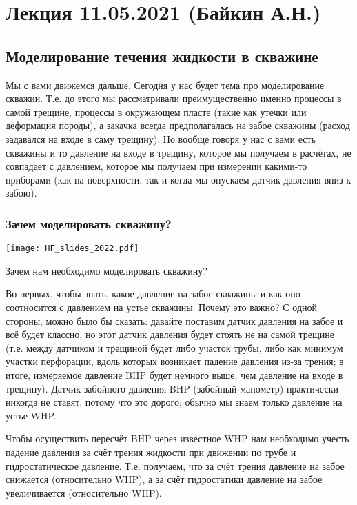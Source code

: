\documentclass[main.tex]{subfiles}
\begin{document}

\section{Лекция 11.05.2021 (Байкин А.Н.)}

\subsection{Моделирование течения жидкости в скважине}

Мы с вами движемся дальше.
Сегодня у нас будет тема про моделирование скважин.
Т.е. до этого мы рассматривали преимущественно именно процессы в самой трещине, процессы в окружающем пласте (такие как утечки или деформация породы), а закачка всегда предполагалась на забое скважины (расход задавался на входе в саму трещину).
Но вообще говоря у нас с вами есть скважины и то давление на входе в трещину, которое мы получаем в расчётах, не совпадает с давлением, которое мы получаем при измерении какими-то приборами (как на поверхности, так и когда мы опускаем датчик давления вниз к забою).
\\

\subsubsection{Зачем моделировать скважину?}

\texttt{[image: HF\_slides\_2022.pdf]}

Зачем нам необходимо моделировать скважину?

Во-первых, чтобы знать, какое давление на забое скважины и как оно соотносится с давлением на устье скважины.
Почему это важно?
С одной стороны, можно было бы сказать: давайте поставим датчик давления на забое и всё будет классно, но этот датчик давления будет стоять не на самой трещине (т.е. между датчиком и трещиной будет либо участок трубы, либо как минимум участки перфорации, вдоль которых возникает падение давления из-за трения; в итоге, измеряемое давление BHP будет немного выше, чем давление на входе в трещину).
Датчик забойного давления BHP (забойный манометр) практически никогда не ставят, потому что это дорого; обычно мы знаем только давление на устье WHP.

Чтобы осуществить пересчёт BHP через известное WHP нам необходимо учесть падение давления за счёт трения жидкости при движении по трубе и гидростатическое давление.
Т.е. получаем, что за счёт трения давление на забое снижается (относительно WHP), а за счёт гидростатики давление на забое увеличивается (относительно WHP).
\end{document}

